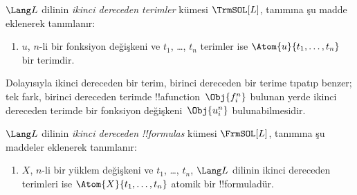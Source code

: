 \begin{defn}
$\Lang L$ dilinin \emph{ikinci dereceden terimler} kümesi $\TrmSOL[L]$,
 tanımına şu madde eklenerek tanımlanır:
\begin{enumerate}
\item $u$, $n$-li bir fonksiyon değişkeni ve $t_1$, \dots, $t_n$ terimler
  ise $\Atom{u}{t_1, \ldots, t_n}$ bir terimdir.
\end{enumerate}
\end{defn}

\begin{explain}
Dolayısıyla ikinci dereceden bir terim, birinci dereceden bir terime tıpatıp
benzer; tek fark, birinci dereceden terimde !!a{function}~$\Obj{f^n_i}$
bulunan yerde ikinci dereceden terimde bir fonksiyon değişkeni~$\Obj{u^n_i}$
bulunabilmesidir.
\end{explain}

\begin{defn}
$\Lang L$ dilinin \emph{ikinci dereceden !!{formula}s} kümesi
$\FrmSOL[L]$,  tanımına şu maddeler
eklenerek tanımlanır:
\begin{enumerate}
\item $X$, $n$-li bir yüklem değişkeni ve $t_1$, \dots, $t_n$,
  $\Lang L$ dilinin ikinci dereceden terimleri ise
  $\Atom{X}{t_1,\ldots, t_n}$ atomik bir !!{formula}{}dür.




\end{enumerate}
\end{defn}

